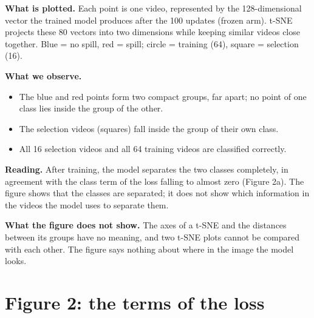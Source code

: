 \documentclass[11pt,a4paper]{article}
\newcommand{\reading}[1]{\textbf{Reading.} #1}
\begin{document}
\textbf{What is plotted.} Each point is one video, represented by the 128-dimensional vector
the trained model produces after the 100 updates (frozen arm). t-SNE projects these 80 vectors
into two dimensions while keeping similar videos close together.
Blue = no spill, red = spill; circle = training (64), square = selection (16).

\textbf{What we observe.}
\begin{itemize}\itemsep1pt
\item The blue and red points form two compact groups, far apart; no point of one class lies
      inside the group of the other.
\item The selection videos (squares) fall inside the group of their own class.
\item All 16 selection videos and all 64 training videos are classified correctly.
\end{itemize}

\reading{After training, the model separates the two classes completely, in agreement with the
class term of the loss falling to almost zero (Figure 2a). The figure shows that the classes are
separated; it does not show which information in the videos the model uses to separate them.}

\textbf{What the figure does not show.} The axes of a t-SNE and the distances between its groups
have no meaning, and two t-SNE plots cannot be compared with each other. The figure says nothing
about where in the image the model looks.

\newpage
\section*{Figure 2: the terms of the loss}
\end{document}
